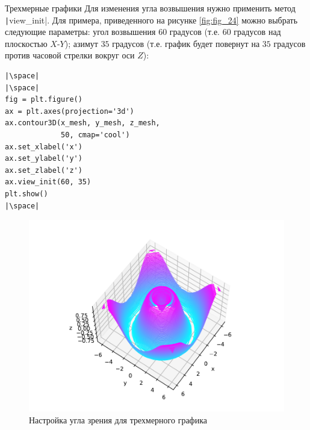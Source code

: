 \documentclass[aspectratio=169, mathserif]{beamer}	%
\begin{document}
\begin{frame}[fragile, label=m]{Трехмерные графики}
\scriptsize
Для изменения угла возвышения нужно применить метод \texttt|view_init|. Для примера, приведенного на рисунке \ref{fig:fig_24} можно выбрать следующие параметры: угол возвышения $60$ градусов (т.е. $60$ градусов над плоскостью $X$-$Y$); азимут $35$ градусов (т.е. график будет повернут на $35$ градусов против часовой стрелки вокруг оси $Z$):
\vfill
\begin{minipage}{.4\textwidth}
\begin{verbatim}
|\space|
|\space|
fig = plt.figure()
ax = plt.axes(projection='3d')
ax.contour3D(x_mesh, y_mesh, z_mesh,
             50, cmap='cool')
ax.set_xlabel('x')
ax.set_ylabel('y')
ax.set_zlabel('z')
ax.view_init(60, 35)
plt.show()
|\space|
\end{verbatim}
\end{minipage}
\begin{minipage}{.09\textwidth}
\hfill
\end{minipage}
\begin{minipage}{.5\textwidth}
\begin{figure}[h!]
	\centering
	\includegraphics[width=.8\linewidth]{./pics/Figure_25}
	\caption{Настройка угла зрения для трехмерного графика}
	\label{fig:fig_25}
\end{figure}
\end{minipage}
\vfill
\end{frame}

\end{document}
